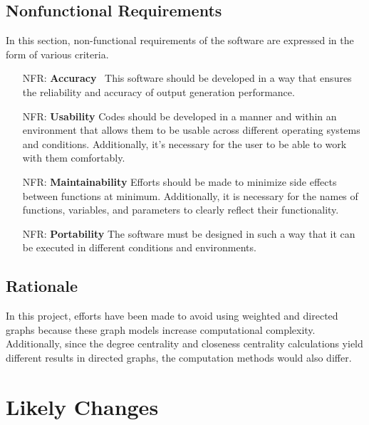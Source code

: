 \documentclass[12pt]{article}
\newcounter{nfrnum} %
\begin{document}
\subsection{Nonfunctional Requirements}
In this section, non-functional requirements of the software are expressed in the form of various criteria.

\noindent \begin{itemize}

\item[NFR\refstepcounter{nfrnum}\thenfrnum \label{NFR_Accuracy}:]
  \textbf{Accuracy} \
This software should be developed in a way that ensures the reliability and accuracy of output generation performance.
\item[NFR\refstepcounter{nfrnum}\thenfrnum \label{NFR_Usability}:] \textbf{Usability}
Codes should be developed in a manner and within an environment that allows them to be usable across different operating systems and conditions. Additionally, it's necessary for the user to be able to work with them comfortably.
\item[NFR\refstepcounter{nfrnum}\thenfrnum \label{NFR_Maintainability}:]
  \textbf{Maintainability} 
Efforts should be made to minimize side effects between functions at minimum. Additionally, it is necessary for the names of functions, variables, and parameters to clearly reflect their functionality.

\item[NFR\refstepcounter{nfrnum}\thenfrnum \label{NFR_Portability}:]
  \textbf{Portability}
The software must be designed in such a way that it can be executed in different conditions and environments.


\end{itemize}

\subsection{Rationale}


In this project, efforts have been made to avoid using weighted and directed graphs because these graph models increase computational complexity. Additionally, since the degree centrality and closeness centrality calculations yield different results in directed graphs, the computation methods would also differ.

\section{Likely Changes}    
\end{document}
